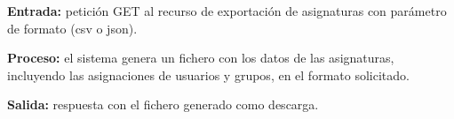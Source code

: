 \begin{functional}
    \textbf{Entrada:} petición GET al recurso de exportación de asignaturas con parámetro
    de formato (\acs{csv} o \acs{json}).

    \textbf{Proceso:} el sistema genera un fichero con los datos de las asignaturas,
    incluyendo las asignaciones de usuarios y grupos, en el formato solicitado.

    \textbf{Salida:} respuesta con el fichero generado como descarga.

\end{functional}
